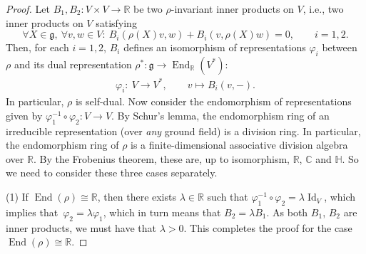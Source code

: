 \documentclass[pdftex]{sigma}
\numberwithin{equation}{section}
\DeclareMathOperator{\Id}{Id}
\DeclareMathOperator{\End}{End}
\begin{document}
		\begin{proof}
			Let $B_1, B_2 \colon V \times V \to \mathbb{R}$ be two $\rho$-invariant inner products on $V$, i.e., two inner products on $V$ satisfying
			\begin{equation*}
				\forall X \in \mathfrak{g} ,\ \forall v,w \in V \colon \ B_i (\rho(X)v , w) + B_i (v,\rho(X)w) = 0 , \qquad i=1,2 .
			\end{equation*}
			Then, for each $i = 1,2$, $B_i$ defines an isomorphism of representations $\varphi_i$ between $\rho$ and its dual representation $\rho^{*}\colon \mathfrak{g} \to \End_{\mathbb{R}}(V^{*})$:
			\begin{align*}
				\varphi_i \colon \ V \to V^{*},\qquad
				v \mapsto B_i (v , -) .
			\end{align*}
			In particular, $\rho$ is self-dual. Now consider the endomorphism of representations given by $\varphi_1^{-1} \circ \varphi_2 \colon V \to V$. By Schur's lemma, the endomorphism ring of an irreducible representation (over \textit{any} ground field) is a division ring. In particular, the endomorphism ring of $\rho$ is a finite-dimensional associative division algebra over $\mathbb{R}$. By the Frobenius theorem, these are, up to isomorphism, $\mathbb{R}$, $\mathbb{C}$ and $\mathbb{H}$. So we need to consider these three cases separately.

(1) If $\End(\rho) \cong \mathbb{R}$, then there exists $\lambda \in \mathbb{R}$ such that $\varphi_1^{-1} \circ \varphi_2 = \lambda \Id_V$, which implies that~${\varphi_2 = \lambda \varphi_1}$, which in turn means that $B_2 = \lambda B_1$. As both $B_1$, $B_2$ are inner products, we must have that $\lambda > 0$. This completes the proof for the case $\End(\rho) \cong \mathbb{R}$.
				

\end{proof}
\end{document}
